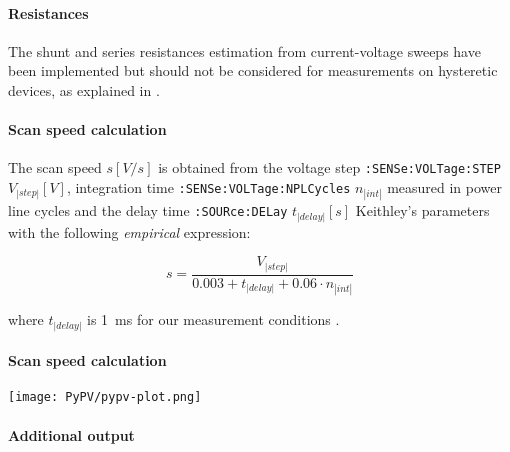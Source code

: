 		\paragraph{Resistances} The shunt and series resistances estimation from current-voltage sweeps have been implemented but should not be considered for measurements on hysteretic devices, as explained in .

		\paragraph{Scan speed calculation}
		The scan speed $s[V/s]$ is obtained from the voltage step \texttt{:SENSe:VOLTage:STEP} $V_|step|[V]$, integration time \texttt{:SENSe:VOLTage:NPLCycles} $n_|int|$ measured in power line cycles and the delay time \texttt{:SOURce:DELay} $t_|delay|[s]$ Keithley's parameters with the following \textit{empirical} expression:

		\begin{equation}
			s = \frac{V_|step|}{0.003 + t_|delay| + 0.06 \cdot n_|int|}
		\end{equation}

		where $t_|delay|$ is \SI{1}{\ms} for our measurement conditions \cite{Keithley2011}.

		\paragraph{Scan speed calculation}

\begin{SCfigure}
	\centering
	\texttt{[image: PyPV/pypv-plot.png]}
	\mycaption[]{}\label{fig:pypv-plot}
\end{SCfigure}

\paragraph{Additional output}

\begin{figure}
\end{figure}

